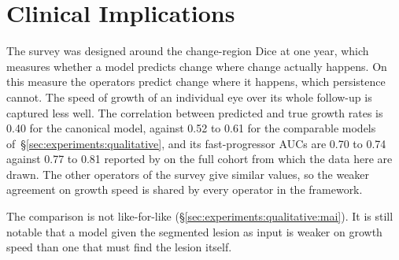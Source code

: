 \section{Clinical Implications}
\label{sec:discussion:clinical}

The survey was designed around the change-region Dice at one year, which
measures whether a model predicts change where change actually happens. On
this measure the operators predict change where it happens, which
persistence cannot. The speed of
growth of an individual eye over its whole follow-up is captured less
well. The correlation between predicted and true growth rates is 0.40 for
the canonical model, against 0.52 to 0.61 for the comparable models
of~\S\ref{sec:experiments:qualitative}, and its fast-progressor AUCs are
0.70 to 0.74 against 0.77 to 0.81 reported by \citet{Mai2024} on the full
cohort from which the data here are drawn. The other operators of the
survey give similar values, so the weaker agreement on growth speed is
shared by every operator in the framework.

The comparison is not like-for-like
(\S\ref{sec:experiments:qualitative:mai}). It is still notable that a model given the segmented lesion
as input is weaker on growth speed than one that must find the lesion
itself.

